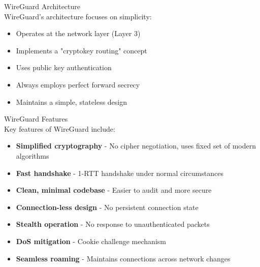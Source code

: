 \begin{concept}{WireGuard Architecture}\\
WireGuard's architecture focuses on simplicity:
\begin{itemize}
    \item Operates at the network layer (Layer 3)
    \item Implements a "cryptokey routing" concept
    \item Uses public key authentication
    \item Always employs perfect forward secrecy
    \item Maintains a simple, stateless design
\end{itemize}
\end{concept}

\begin{theorem}{WireGuard Features}\\
Key features of WireGuard include:
\begin{itemize}
    \item \textbf{Simplified cryptography} - No cipher negotiation, uses fixed set of modern algorithms
    \item \textbf{Fast handshake} - 1-RTT handshake under normal circumstances
    \item \textbf{Clean, minimal codebase} - Easier to audit and more secure
    \item \textbf{Connection-less design} - No persistent connection state
    \item \textbf{Stealth operation} - No response to unauthenticated packets
    \item \textbf{DoS mitigation} - Cookie challenge mechanism
    \item \textbf{Seamless roaming} - Maintains connections across network changes
\end{itemize}
\end{theorem}

